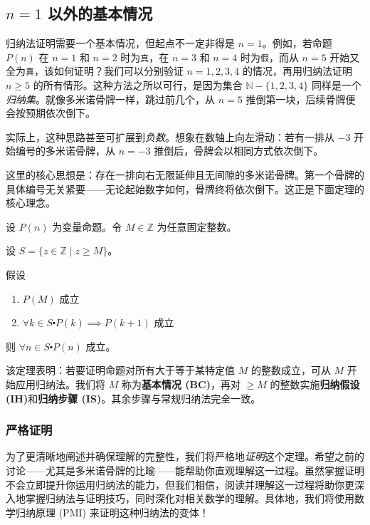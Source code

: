 \subsection{$n = 1$ 以外的基本情况}\label{sec:section5.3.1}

归纳法证明需要一个基本情况，但起点不一定非得是 $n = 1$。例如，若命题 $P(n)$ 在 $n = 1$ 和 $n = 2$ 时为\verb|真|，在 $n = 3$ 和 $n = 4$ 时为\verb|假|，而从 $n = 5$ 开始又全为\verb|真|，该如何证明？我们可以分别验证 $n = 1, 2, 3, 4$ 的情况，再用归纳法证明 $n \ge 5$ 的所有情形。这种方法之所以可行，是因为集合 $\mathbb{N} - \{1, 2, 3, 4\}$ 同样是一个\emph{归纳集}。就像多米诺骨牌一样，跳过前几个，从 $n = 5$ 推倒第一块，后续骨牌便会按预期依次倒下。

实际上，这种思路甚至可扩展到\emph{负数}。想象在数轴上向左滑动：若有一排从 $-3$ 开始编号的多米诺骨牌，从 $n = -3$ 推倒后，骨牌会以相同方式依次倒下。

这里的核心思想是：存在一排向右无限延伸且无间隙的多米诺骨牌。第一个骨牌的具体编号无关紧要——无论起始数字如何，骨牌终将依次倒下。这正是下面定理的核心理念。

\begin{theorem}[任意基本情况的归纳]\label{theorem5.3.1}
    设 $P(n)$ 为变量命题。令 $M \in \mathbb{Z}$ 为任意固定整数。

    设 $S = \{z \in \mathbb{Z} \mid z \ge M\}$。

    假设
    \begin{enumerate}[label=(\arabic*)]
        \item $P(M)$ 成立
        \item $\forall k \in S \centerdot P(k) \implies P(k + 1)$ 成立
    \end{enumerate}

    则 $\forall n \in S \centerdot P(n)$ 成立。
\end{theorem}

该定理表明：若要证明命题对所有大于等于某特定值 $M$ 的整数成立，可从 $M$ 开始应用归纳法。我们将 $M$ 称为\textbf{基本情况 (BC)}，再对 $\ge M$ 的整数实施\textbf{归纳假设 (IH)}和\textbf{归纳步骤 (IS)}。其余步骤与常规归纳法完全一致。

\subsubsection*{严格证明}

为了更清晰地阐述并确保理解的完整性，我们将严格地\emph{证明}这个定理。希望之前的讨论——尤其是多米诺骨牌的比喻——能帮助你直观理解这一过程。虽然掌握证明不会立即提升你运用归纳法的能力，但我们相信，阅读并理解这一过程将助你更深入地掌握归纳法与证明技巧，同时深化对相关数学的理解。具体地，我们将使用数学归纳原理 (PMI) 来证明这种归纳法的变体！

